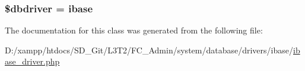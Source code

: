 \subsubsection[{\$dbdriver}]{\setlength{\rightskip}{0pt plus 5cm}\$dbdriver = \textquotesingle{}ibase\textquotesingle{}}\label{class_c_i___d_b__ibase__driver_a0cde2a16322a023d040aa7f725877597}


The documentation for this class was generated from the following file\+:\begin{DoxyCompactItemize}
\item 
D\+:/xampp/htdocs/\+S\+D\+\_\+\+Git/\+L3\+T2/\+F\+C\+\_\+\+Admin/system/database/drivers/ibase/\hyperlink{ibase__driver_8php}{ibase\+\_\+driver.\+php}\end{DoxyCompactItemize}
